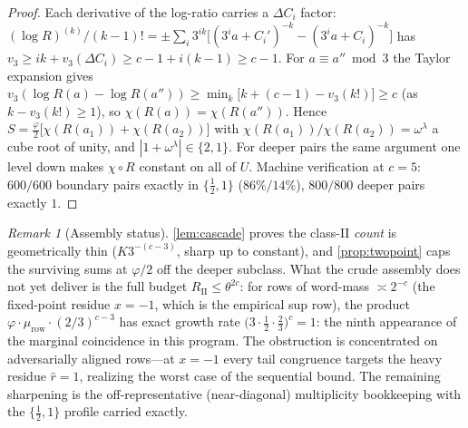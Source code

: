 \documentclass[11pt]{article}
\theoremstyle{plain}
\theoremstyle{definition}
\theoremstyle{remark}
\newtheorem*{remark}{Remark}
\begin{document}
\begin{proof}
Each derivative of the log-ratio carries a $\Delta C_i$ factor:
$(\log R)^{(k)}/(k-1)!=\pm\sum_i3^{ik}\bigl[(3^ia+C_i')^{-k}-(3^ia+C_i)^{-k}\bigr]$
has $v_3\ge ik+v_3(\Delta C_i)\ge c-1+i(k-1)\ge c-1$. For $a\equiv a''\bmod3$
the Taylor expansion gives
$v_3(\log R(a)-\log R(a''))\ge\min_k\bigl[k+(c-1)-v_3(k!)\bigr]\ge c$
(as $k-v_3(k!)\ge1$), so $\chi(R(a))=\chi(R(a''))$. Hence
$S=\tfrac{\varphi}2\bigl[\chi(R(a_1))+\chi(R(a_2))\bigr]$ with
$\chi(R(a_1))/\chi(R(a_2))=\omega^\lambda$ a cube root of unity, and
$|1+\omega^\lambda|\in\{2,1\}$. For deeper pairs the same argument one level
down makes $\chi\circ R$ constant on all of $U$. Machine verification at
$c=5$: $600/600$ boundary pairs exactly in $\{\tfrac12,1\}$
($86\%/14\%$), $800/800$ deeper pairs exactly $1$.
\end{proof}

\begin{remark}[Assembly status]
\cref{lem:cascade} proves the class-II \emph{count} is geometrically thin
($K3^{-(c-3)}$, sharp up to constant), and \cref{prop:twopoint} caps the
surviving sums at $\varphi/2$ off the deeper subclass. What the crude
assembly does not yet deliver is the full budget $R_{\mathrm{II}}\le
\theta^{2c}$: for rows of word-mass $\asymp2^{-c}$ (the fixed-point residue
$x=-1$, which is the empirical sup row), the product
$\varphi\cdot\mu_{\mathrm{row}}\cdot(2/3)^{c-3}$ has exact growth rate
$\bigl(3\cdot\tfrac12\cdot\tfrac23\bigr)^c=1$: the ninth appearance of the
marginal coincidence in this program. The obstruction is concentrated on
adversarially aligned rows---at $x=-1$ every tail congruence targets the
heavy residue $\hat r=1$, realizing the worst case of the sequential bound.
The remaining sharpening is the off-representative (near-diagonal)
multiplicity bookkeeping with the $\{\tfrac12,1\}$ profile carried exactly.
\end{remark}
\end{document}
